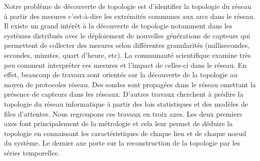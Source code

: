 Notre probl\`eme de d\'ecouverte de topologie est d'identifier la topologie du r\'eseau \`a partir des mesures c'est-\`a-dire les extr\'emit\'es communes aux arcs dans le r\'eseau.
\newline
Il existe un grand int\'er\^et \`a la d\'ecouverte de topologie notamment dans les syst\`emes distribu\'es avec le d\'eploiement de nouvelles g\'en\'erations de capteurs qui permettent de collecter des mesures selon diff\'erentes granularit\'es (millisecondes, secondes, minutes, quart d'heure, etc).
La communaut\'e scientifique examine tr\`es peu comment interpr\'eter ces mesures et l'impact de celles-ci dans le r\'eseau.
En effet, beaucoup de travaux sont orient\'es sur la d\'ecouverte de la topologie au moyen de protocoles r\'eseau. Des sondes sont propag\'ees dans le r\'eseau omettant la pr\'esence de capteurs dans les r\'eseaux. D'autres travaux cherchent \`a pr\'edire la topologie du r\'eseau informatique \`a partir des lois statistiques et des mod\`eles de files d'attentes.
\newline
Nous regroupons ces travaux en troix axes.
Les deux premiers axes font principalement de la m\'etrologie et cela leur permet de d\'eduire la topologie en connaissant les caract\'eristiques de chaque lien et de chaque noeud du syst\`eme.
Le dernier axe porte sur la reconstruction de la topologie par les s\'eries temporelles.

